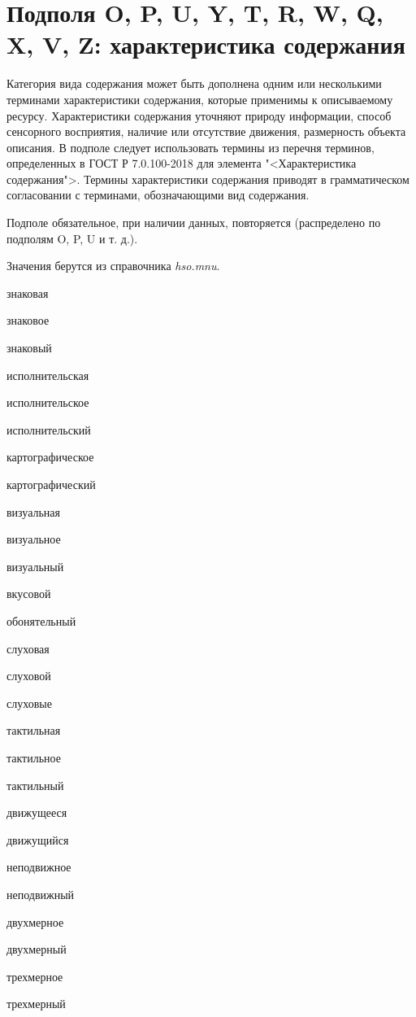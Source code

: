 \section{Подполя O, P, U, Y, T, R, W, Q, X, V, Z: характеристика содержания}

Категория вида содержания может быть дополнена одним или несколькими терминами характеристики содержания, которые применимы к описываемому ресурсу. Характеристики содержания уточняют природу информации, способ сенсорного восприятия, наличие или отсутствие движения, размерность объекта описания. В подполе следует использовать термины из перечня терминов, определенных в ГОСТ Р 7.0.100-2018 для элемента "<Характеристика содержания">. Термины характеристики содержания приводят в грамматическом согласовании с терминами, обозначающими вид содержания.

Подполе обязательное, при наличии данных, повторяется (распределено по подполям O, P, U и т. д.).

Значения берутся из справочника \emph{hso.mnu}.

\begin{cutelist}
    \item знаковая
    \item знаковое
    \item знаковый
    \item исполнительская
    \item исполнительское
    \item исполнительский
    \item картографическое
    \item картографический
    \item визуальная
    \item визуальное
    \item визуальный
    \item вкусовой
    \item обонятельный
    \item слуховая
    \item слуховой
    \item слуховые
    \item тактильная
    \item тактильное
    \item тактильный
    \item движущееся
    \item движущийся
    \item неподвижное
    \item неподвижный
    \item двухмерное
    \item двухмерный
    \item трехмерное
    \item трехмерный
\end{cutelist}

